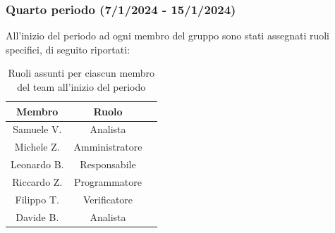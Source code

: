 \subsubsection{Quarto periodo (7/1/2024 - 15/1/2024)}
All'inizio del periodo ad ogni membro del gruppo sono stati assegnati ruoli specifici, di seguito riportati:
\begin{table}[H]
\centering
\begin{tabular}{|c|c|c|}
\hline
\textbf{Membro} & \textbf{Ruolo} \\
\hline
Samuele V. & Analista \\
\hline
Michele Z. & Amministratore \\
\hline
Leonardo B. & Responsabile \\
\hline
Riccardo Z. & Programmatore \\
\hline
Filippo T. & Verificatore \\
\hline
Davide B. & Analista \\
\hline
\end{tabular}
\caption{Ruoli assunti per ciascun membro del team all'inizio del periodo}
\end{table}


